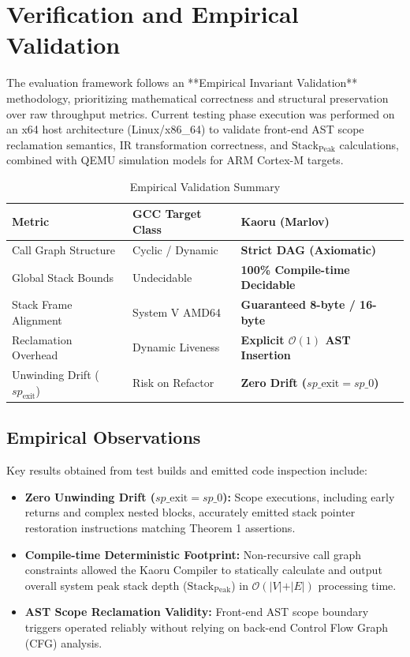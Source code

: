 \documentclass[conference]{IEEEtran}
\begin{document}
\section{Verification and Empirical Validation}

The evaluation framework follows an **Empirical Invariant Validation** methodology, prioritizing mathematical correctness and structural preservation over raw throughput metrics. Current testing phase execution was performed on an x64 host architecture (Linux/x86\_64) to validate front-end AST scope reclamation semantics, IR transformation correctness, and $\mathrm{Stack}_{\mathrm{Peak}}$ calculations, combined with QEMU simulation models for ARM Cortex-M targets.

\begin{table}[htbp]
\caption{Empirical Validation Summary}
\label{tab:validation}
\centering
\begin{tabular}{lll}
\toprule
\textbf{Metric} & \textbf{GCC Target Class} & \textbf{Kaoru (Marlov)} \\
\midrule
Call Graph Structure & Cyclic / Dynamic & \textbf{Strict DAG (Axiomatic)} \\
Global Stack Bounds & Undecidable & \textbf{100\% Compile-time Decidable} \\
Stack Frame Alignment & System V AMD64 & \textbf{Guaranteed 8-byte / 16-byte} \\
Reclamation Overhead & Dynamic Liveness & \textbf{Explicit $\mathcal{O}(1)$ AST Insertion} \\
Unwinding Drift ($sp_{\text{exit}}$) & Risk on Refactor & \textbf{Zero Drift ($sp\_{\text{exit}} = sp\_0$)} \\
\bottomrule
\end{tabular}
\end{table}

\subsection{Empirical Observations}
Key results obtained from test builds and emitted code inspection include:
\begin{itemize}
    \item \textbf{Zero Unwinding Drift ($sp\_{\text{exit}} = sp\_0$):} Scope executions, including early returns and complex nested blocks, accurately emitted stack pointer restoration instructions matching Theorem 1 assertions.
    \item \textbf{Compile-time Deterministic Footprint:} Non-recursive call graph constraints allowed the Kaoru Compiler to statically calculate and output overall system peak stack depth ($\mathrm{Stack}_{\mathrm{Peak}}$) in $\mathcal{O}(\vert{}V\vert{} + \vert{}E\vert{})$ processing time.
    \item \textbf{AST Scope Reclamation Validity:} Front-end AST scope boundary triggers operated reliably without relying on back-end Control Flow Graph (CFG) analysis.
\end{itemize}
\end{document}
